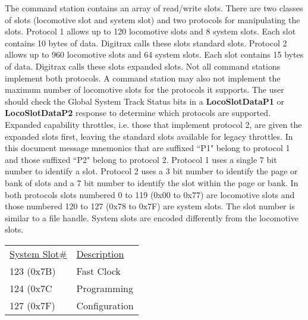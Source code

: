 The command station contains an array of read/write slots. There are two classes of slots (\gls{locomotive slot} and \gls{system slot}) and two protocols for manipulating the slots. Protocol 1 allows up to 120 locomotive slots and 8 system slots. Each slot contains 10 bytes of data. Digitrax calls these slots \gls{standard slots}. Protocol 2 allows up to 960 locomotive slots and 64 system slots. Each slot contains 15 bytes of data. Digitrax calls these slots \gls{expanded slots}. Not all command stations implement both protocols. A command station may also not implement the maximum number of locomotive slots for the protocols it supports.  The user should check the \gls{Global System Track Status} bits in a \textbf{LocoSlotDataP1} or \textbf{LocoSlotDataP2} response to determine which protocols are supported. Expanded capability throttles, i.e. those that implement protocol 2,  are given the expanded slots first, leaving the standard slots available for legacy throttles.  In this document message mnemonics that are suffixed ``P1" belong to protocol 1 and those suffixed ``P2" belong to protocol 2. Protocol 1 uses a single 7 bit number to identify a slot. Protocol 2 uses a 3 bit number to identify the page or bank of slots and a 7 bit number to identify the slot within the page or bank. In both protocols slots numbered 0 to 119 (0x00 to 0x77) are locomotive slots and those numbered 120 to 127 (0x78 to 0x7F) are system slots. The slot number is similar to a file handle. System slots are encoded differently from the locomotive slots. 

\begin{tabular}{l l}
\underline{System Slot\#} & \underline{Description}\\
123 (0x7B) & Fast Clock\\
124 (0x7C & Programming\\
127 (0x7F) & Configuration\\
\end{tabular}
